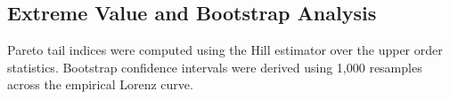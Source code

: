 \documentclass[11pt,a4paper]{article}
\begin{document}
\subsection*{Extreme Value and Bootstrap Analysis}
Pareto tail indices were computed using the Hill estimator over the upper order statistics. Bootstrap confidence intervals were derived using 1,000 resamples across the empirical Lorenz curve.



\end{document}
